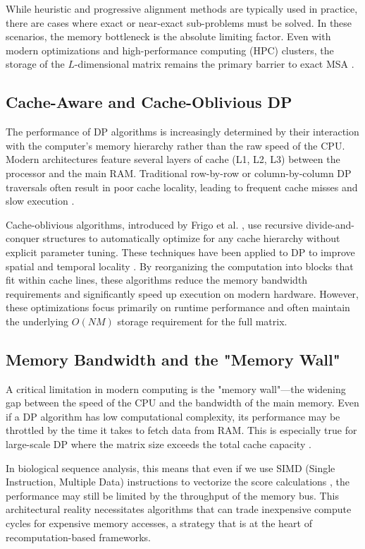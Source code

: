 While heuristic and progressive alignment methods are typically used in practice, there are cases where exact or near-exact sub-problems must be solved. In these scenarios, the memory bottleneck is the absolute limiting factor. Even with modern optimizations and high-performance computing (HPC) clusters, the storage of the $L$-dimensional matrix remains the primary barrier to exact MSA \cite{Tan2006}.

\subsection{Cache-Aware and Cache-Oblivious DP}
The performance of DP algorithms is increasingly determined by their interaction with the computer's memory hierarchy rather than the raw speed of the CPU. Modern architectures feature several layers of cache (L1, L2, L3) between the processor and the main RAM. Traditional row-by-row or column-by-column DP traversals often result in poor cache locality, leading to frequent cache misses and slow execution \cite{Tan2006}.

Cache-oblivious algorithms, introduced by Frigo et al. \cite{Frigo1999}, use recursive divide-and-conquer structures to automatically optimize for any cache hierarchy without explicit parameter tuning. These techniques have been applied to DP to improve spatial and temporal locality \cite{Chowdhury2006}. By reorganizing the computation into blocks that fit within cache lines, these algorithms reduce the memory bandwidth requirements and significantly speed up execution on modern hardware. However, these optimizations focus primarily on runtime performance and often maintain the underlying $O(NM)$ storage requirement for the full matrix.

\subsection{Memory Bandwidth and the "Memory Wall"}
A critical limitation in modern computing is the "memory wall"---the widening gap between the speed of the CPU and the bandwidth of the main memory. Even if a DP algorithm has low computational complexity, its performance may be throttled by the time it takes to fetch data from RAM. This is especially true for large-scale DP where the matrix size exceeds the total cache capacity \cite{Tan2006, Wozniak1997}.

In biological sequence analysis, this means that even if we use SIMD (Single Instruction, Multiple Data) instructions to vectorize the score calculations \cite{Rognes2011, Daily2016, Farrar2007}, the performance may still be limited by the throughput of the memory bus. This architectural reality necessitates algorithms that can trade inexpensive compute cycles for expensive memory accesses, a strategy that is at the heart of recomputation-based frameworks.

